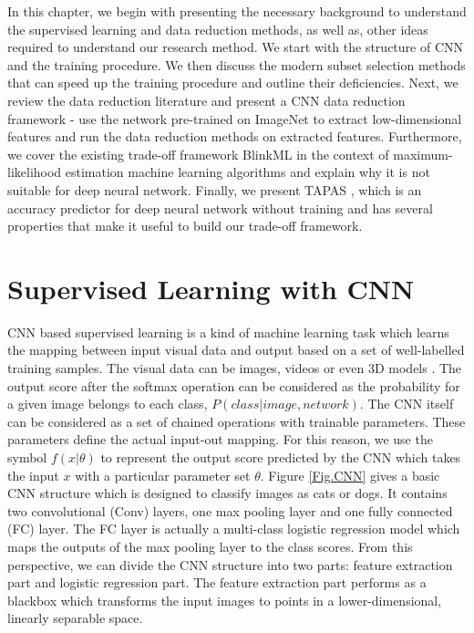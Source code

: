In this chapter, we begin with presenting the necessary background to understand the supervised learning and data reduction methods, as well as, other ideas required to understand our research method.  We start with the structure of CNN and the training procedure. We then discuss the modern subset selection methods that can speed up the training procedure and outline their deficiencies. Next, we review the data reduction literature and present a CNN data reduction framework - use the network pre-trained on ImageNet to extract low-dimensional features and run the data reduction methods on extracted features. Furthermore, we cover the existing trade-off framework BlinkML \cite{Park2019a} in the context of maximum-likelihood estimation machine learning algorithms and explain why it is not suitable for deep neural network. Finally, we present TAPAS \cite{Istrate2019}, which is an accuracy predictor for deep neural network without training and has several properties that make it useful to build our trade-off framework.

\section{Supervised Learning with CNN}
\label{slcnn}
CNN based supervised learning is a kind of machine learning task which learns the mapping between input visual data and output based on a set of well-labelled training samples. The visual data can be images, videos or even 3D models \cite{Song2020}. The output score after the softmax operation can be considered as the probability for a given image belongs to each class, $P(class|image, network)$. The CNN itself can be considered as a set of chained operations with trainable parameters. These parameters define the actual input-out mapping. For this reason, we use the symbol $f(x|\theta)$ to represent the output score predicted by the CNN which takes the input $x$ with a particular parameter set $\theta$. Figure \ref{Fig.CNN} gives a basic CNN structure which is designed to classify images as cats or dogs. It contains two convolutional (Conv) layers, one max pooling layer and one fully connected (FC) layer. The FC layer is actually a multi-class logistic regression model which maps the outputs of the max pooling layer to the class scores. From this perspective, we can divide the CNN structure into two parts: feature extraction part and logistic regression part. The feature extraction part performs as a blackbox which transforms the input images to points in a lower-dimensional, linearly separable space.


